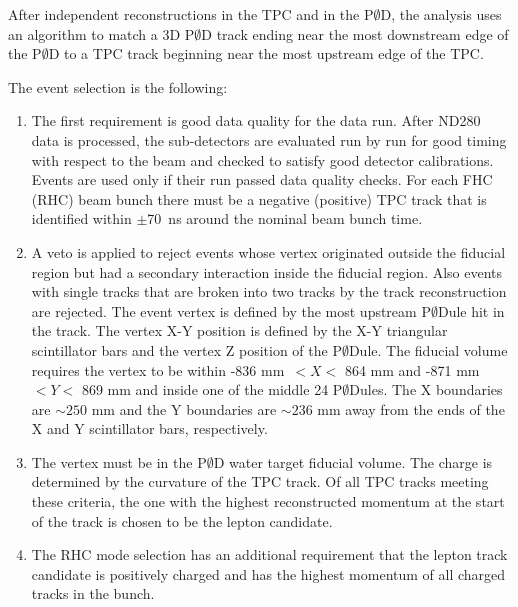 After independent reconstructions in the TPC and in the P$\emptyset$D, the analysis
uses an algorithm to match a 3D P$\emptyset$D track ending
near the most downstream edge of the P$\emptyset$D to a TPC track beginning
near the most upstream edge of the TPC.

The event selection is the following: 
\begin{enumerate}
\item The first requirement is good data quality for the data run.
After ND280 data is processed, the sub-detectors are evaluated 
run by run for
good timing with respect to the beam and 
checked to satisfy good detector calibrations.
Events are used only if their run passed data quality checks.
For each FHC (RHC) 
beam bunch there must be a negative (positive) TPC track
that is identified within $\pm$70~ns around the
nominal beam bunch time. 

\item A veto is applied to reject events whose vertex originated
outside the fiducial region but had a secondary interaction
inside the fiducial region. Also events with
single tracks that are broken into two tracks by the track reconstruction
are rejected. The event vertex is defined by the most upstream P$\emptyset$Dule
hit in the track. The vertex X-Y position is defined by the X-Y triangular
scintillator bars and the vertex Z position of the P$\emptyset$Dule. The fiducial
volume requires the vertex to be within -836 mm\ $<X<$ 864 mm and
-871 mm\ $<Y<$ 869 mm and inside one of the middle 24 P$\emptyset$Dules. 
The X boundaries are $\sim 250$ mm and the Y boundaries are
$\sim 236$ mm away from the ends of the X and Y scintillator bars, respectively.
\item The vertex must be in the
P$\emptyset$D water target fiducial volume. The charge is determined by the
curvature of the TPC track. Of all TPC tracks meeting these criteria, the
one with the highest reconstructed momentum at the start of the track
is chosen to be the lepton candidate. 
\item The RHC mode selection has an additional requirement
that the lepton track candidate is positively charged
and has the highest momentum of all 
charged tracks in the bunch.
\end{enumerate}

